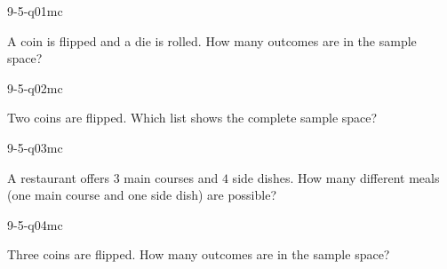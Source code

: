 

\begin{practiceQuestion}{9-5-q01}{mc}
\begin{questionText}
A coin is flipped and a die is rolled. How many outcomes are in the sample space?
\end{questionText}
\end{practiceQuestion}

\begin{practiceQuestion}{9-5-q02}{mc}
\begin{questionText}
Two coins are flipped. Which list shows the complete sample space?
\end{questionText}
\end{practiceQuestion}

\begin{practiceQuestion}{9-5-q03}{mc}
\begin{questionText}
A restaurant offers $3$ main courses and $4$ side dishes. How many different meals (one main course and one side dish) are possible?
\end{questionText}
\end{practiceQuestion}

\begin{practiceQuestion}{9-5-q04}{mc}
\begin{questionText}
Three coins are flipped. How many outcomes are in the sample space?
\end{questionText}
\end{practiceQuestion}

